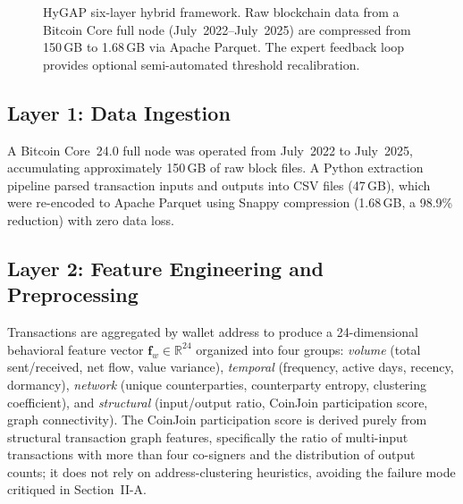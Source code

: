 \documentclass[conference]{IEEEtran}
\begin{document}
\begin{figure}[t]
\caption{HyGAP six-layer hybrid framework. Raw blockchain data from a
Bitcoin Core full node (July~2022--July~2025) are compressed from
150\,GB to 1.68\,GB via Apache Parquet. The expert feedback loop
provides optional semi-automated threshold recalibration.}
\label{fig:arch}
\end{figure}

\subsection{Layer 1: Data Ingestion}
A Bitcoin Core~24.0 full node was operated from July~2022 to
July~2025, accumulating approximately 150\,GB of raw block files.
A Python extraction pipeline parsed transaction inputs and outputs
into CSV files (47\,GB), which were re-encoded to Apache Parquet
using Snappy compression (1.68\,GB, a 98.9\% reduction) with zero
data loss.

\subsection{Layer 2: Feature Engineering and Preprocessing}
Transactions are aggregated by wallet address to produce a
24-dimensional behavioral feature vector $\mathbf{f}_w \in
\mathbb{R}^{24}$ organized into four groups: \emph{volume} (total
sent/received, net flow, value variance), \emph{temporal}
(frequency, active days, recency, dormancy), \emph{network}
(unique counterparties, counterparty entropy, clustering
coefficient), and \emph{structural} (input/output ratio,
CoinJoin participation score, graph connectivity). The CoinJoin
participation score is derived purely from structural transaction
graph features, specifically the ratio of multi-input transactions
with more than four co-signers and the distribution of output
counts; it does not rely on address-clustering heuristics,
avoiding the failure mode critiqued in Section~II-A.
\end{document}
